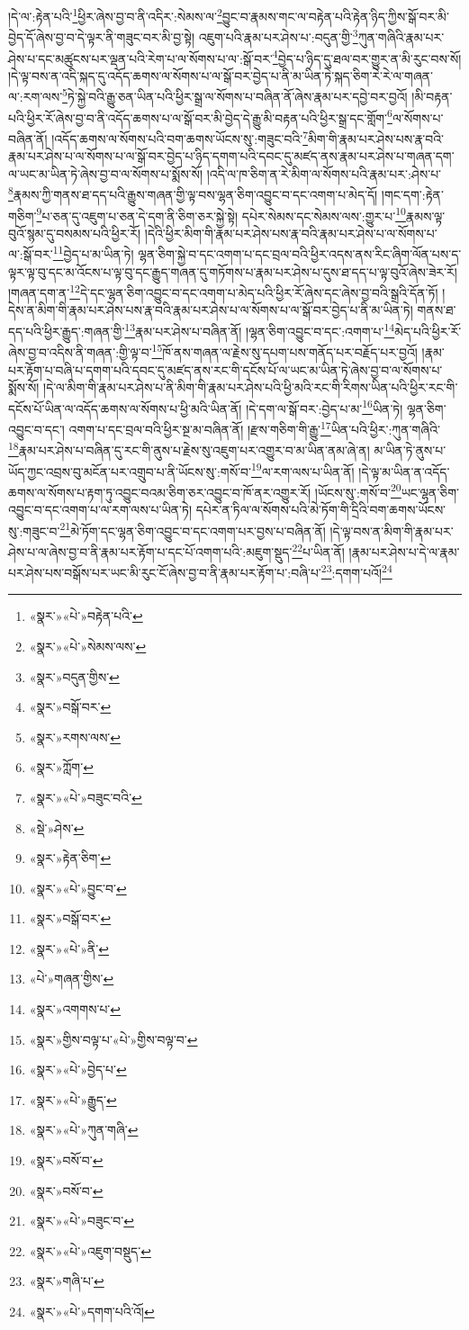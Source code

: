 །དེ་ལ་:རྟེན་པའི་\footnote{«སྣར་»«པེ་»བརྟེན་པའི་}ཕྱིར་ཞེས་བྱ་བ་ནི་འདིར་:སེམས་ལ་\footnote{«སྣར་»«པེ་»སེམས་ལས་}བྱུང་བ་རྣམས་གང་ལ་བརྟེན་པའི་རྟེན་ཉིད་ཀྱིས་སྒོ་བར་མི་བྱེད་དོ་ཞེས་བྱ་བ་དེ་ལྟར་ནི་གཟུང་བར་མི་བྱ་སྟེ། འཇུག་པའི་རྣམ་པར་ཤེས་པ་:བདུན་གྱི་\footnote{«སྣར་»བདུན་གྱིས་}ཀུན་གཞིའི་རྣམ་པར་ཤེས་པ་དང་མཚུངས་པར་ལྡན་པའི་རེག་པ་ལ་སོགས་པ་ལ་:སྒོ་བར་\footnote{«སྣར་»བསྒོ་བར་}བྱེད་པ་ཉིད་དུ་ཐལ་བར་གྱུར་ན་མི་རུང་བས་སོ། །དེ་ལྟ་བས་ན་འདི་སྐད་དུ་འདོད་ཆགས་ལ་སོགས་པ་ལ་སྒོ་བར་བྱེད་པ་ནི་མ་ཡིན་ཏེ་སྐད་ཅིག་རེ་རེ་ལ་གཞན་ལ་:རག་ལས་\footnote{«སྣར་»རགས་ལས་}ཏེ་སྐྱེ་བའི་རྒྱུ་ཅན་ཡིན་པའི་ཕྱིར་སྒྲ་ལ་སོགས་པ་བཞིན་ནོ་ཞེས་རྣམ་པར་དབྱེ་བར་བྱའོ། །མི་བརྟན་པའི་ཕྱིར་རོ་ཞེས་བྱ་བ་ནི་འདོད་ཆགས་པ་ལ་སྒོ་བར་མི་བྱེད་དེ་རྒྱུ་མི་བརྟན་པའི་ཕྱིར་སྒྲ་དང་གློག་\footnote{«སྣར་»ཀློག་}ལ་སོགས་པ་བཞིན་ནོ། །འདོད་ཆགས་ལ་སོགས་པའི་བག་ཆགས་ཡོངས་སུ་:གཟུང་བའི་\footnote{«སྣར་»«པེ་»བཟུང་བའི་}མིག་གི་རྣམ་པར་ཤེས་པས་རྣ་བའི་རྣམ་པར་ཤེས་པ་ལ་སོགས་པ་ལ་སྒོ་བར་བྱེད་པ་ཉིད་དགག་པའི་དབང་དུ་མཛད་ནས་རྣམ་པར་ཤེས་པ་གཞན་དག་ལ་ཡང་མ་ཡིན་ཏེ་ཞེས་བྱ་བ་ལ་སོགས་པ་སྨོས་སོ། །འདི་ལ་ཁ་ཅིག་ན་རེ་མིག་ལ་སོགས་པའི་རྣམ་པར་:ཤེས་པ་\footnote{«སྡེ་»ཤེས་}རྣམས་ཀྱི་གནས་ཐ་དད་པའི་རྒྱུས་གཞན་གྱི་ལྟ་བས་ལྷན་ཅིག་འབྱུང་བ་དང་འགག་པ་མེད་དོ། །གང་དག་:རྟེན་གཅིག་\footnote{«སྣར་»རྟེན་ཅིག་}པ་ཅན་དུ་འཇུག་པ་ཅན་དེ་དག་ནི་ཅིག་ཅར་སྐྱེ་སྟེ། དཔེར་སེམས་དང་སེམས་ལས་:གྱུར་པ་\footnote{«སྣར་»«པེ་»བྱུང་བ་}རྣམས་ལྟ་བུའོ་སྙམ་དུ་བསམས་པའི་ཕྱིར་རོ། །དེའི་ཕྱིར་མིག་གི་རྣམ་པར་ཤེས་པས་རྣ་བའི་རྣམ་པར་ཤེས་པ་ལ་སོགས་པ་ལ་:སྒོ་བར་\footnote{«སྣར་»བསྒོ་བར་}བྱེད་པ་མ་ཡིན་ཏེ། ལྷན་ཅིག་སྐྱེ་བ་དང་འགག་པ་དང་བྲལ་བའི་ཕྱིར་འདས་ནས་རིང་ཞིག་ལོན་པས་ད་ལྟར་ལྟ་བུ་དང་མ་འོངས་པ་ལྟ་བུ་དང་རྒྱུད་གཞན་དུ་གཏོགས་པ་རྣམ་པར་ཤེས་པ་དུས་ཐ་དད་པ་ལྟ་བུའོ་ཞེས་ཟེར་རོ། །གཞན་དག་ན་\footnote{«སྣར་»«པེ་»ནི་}དེ་དང་ལྷན་ཅིག་འབྱུང་བ་དང་འགག་པ་མེད་པའི་ཕྱིར་རོ་ཞེས་དང་ཞེས་བྱ་བའི་སྒྲའི་དོན་ཏོ། །དེས་ན་མིག་གི་རྣམ་པར་ཤེས་པས་རྣ་བའི་རྣམ་པར་ཤེས་པ་ལ་སོགས་པ་ལ་སྒོ་བར་བྱེད་པ་ནི་མ་ཡིན་ཏེ། གནས་ཐ་དད་པའི་ཕྱིར་རྒྱུད་:གཞན་གྱི་\footnote{«པེ་»གཞན་གྱིས་}རྣམ་པར་ཤེས་པ་བཞིན་ནོ། །ལྷན་ཅིག་འབྱུང་བ་དང་:འགག་པ་\footnote{«སྣར་»འགགས་པ་}མེད་པའི་ཕྱིར་རོ་ཞེས་བྱ་བ་འདིས་ནི་གཞན་:གྱི་ལྟ་བ་\footnote{«སྣར་»གྱིས་བལྟ་པ་«པེ་»གྱིས་བལྟ་བ་}ཁོ་ནས་གཞན་ལ་རྗེས་སུ་དཔག་པས་གནོད་པར་བརྗོད་པར་བྱའོ། །རྣམ་པར་རྟོག་པ་བཞི་པ་དགག་པའི་དབང་དུ་མཛད་ནས་རང་གི་དངོས་པོ་ལ་ཡང་མ་ཡིན་ཏེ་ཞེས་བྱ་བ་ལ་སོགས་པ་སྨོས་སོ། །དེ་ལ་མིག་གི་རྣམ་པར་ཤེས་པ་ནི་མིག་གི་རྣམ་པར་ཤེས་པའི་ཕྱི་མའི་རང་གི་རིགས་ཡིན་པའི་ཕྱིར་རང་གི་དངོས་པོ་ཡིན་ལ་འདོད་ཆགས་ལ་སོགས་པ་ཕྱི་མའི་ཡིན་ནོ། །དེ་དག་ལ་སྒོ་བར་:བྱེད་པ་མ་\footnote{«སྣར་»«པེ་»བྱེད་པ་}ཡིན་ཏེ། ལྷན་ཅིག་འབྱུང་བ་དང་། འགག་པ་དང་བྲལ་བའི་ཕྱིར་སྔ་མ་བཞིན་ནོ། །རྫས་གཅིག་གི་རྒྱུ་\footnote{«སྣར་»«པེ་»རྒྱུད་}ཡིན་པའི་ཕྱིར་:ཀུན་གཞིའི་\footnote{«སྣར་»«པེ་»ཀུན་གཞི་}རྣམ་པར་ཤེས་པ་བཞིན་དུ་རང་གི་ནུས་པ་རྗེས་སུ་འཇུག་པར་འགྱུར་བ་མ་ཡིན་ནམ་ཞེ་ན། མ་ཡིན་ཏེ་ནུས་པ་ཡོད་ཀྱང་འབྲས་བུ་མངོན་པར་འགྲུབ་པ་ནི་ཡོངས་སུ་:གསོ་བ་\footnote{«སྣར་»བསོ་བ་}ལ་རག་ལས་པ་ཡིན་ནོ། །དེ་ལྟ་མ་ཡིན་ན་འདོད་ཆགས་ལ་སོགས་པ་རྟག་ཏུ་འབྱུང་བའམ་ཅིག་ཅར་འབྱུང་བ་ཁོ་ནར་འགྱུར་རོ། །ཡོངས་སུ་:གསོ་བ་\footnote{«སྣར་»བསོ་བ་}ཡང་ལྷན་ཅིག་འབྱུང་བ་དང་འགག་པ་ལ་རག་ལས་པ་ཡིན་ཏེ། དཔེར་ན་ཏིལ་ལ་སོགས་པའི་མེ་ཏོག་གི་དྲིའི་བག་ཆགས་ཡོངས་སུ་:གཟུང་བ་\footnote{«སྣར་»«པེ་»བཟུང་བ་}མེ་ཏོག་དང་ལྷན་ཅིག་འབྱུང་བ་དང་འགག་པར་བྱས་པ་བཞིན་ནོ། །དེ་ལྟ་བས་ན་མིག་གི་རྣམ་པར་ཤེས་པ་ལ་ཞེས་བྱ་བ་ནི་རྣམ་པར་རྟོག་པ་དང་པོ་འགག་པའི་:མཇུག་སྡུད་\footnote{«སྣར་»«པེ་»འཇུག་བསྡུད་}པ་ཡིན་ནོ། །རྣམ་པར་ཤེས་པ་དེ་ལ་རྣམ་པར་ཤེས་པས་བསྒོས་པར་ཡང་མི་རུང་ངོ་ཞེས་བྱ་བ་ནི་རྣམ་པར་རྟོག་པ་:བཞི་པ་\footnote{«སྣར་»གཞི་པ་}:དགག་པའོ།\footnote{«སྣར་»«པེ་»དགག་པའི་འོ།} 